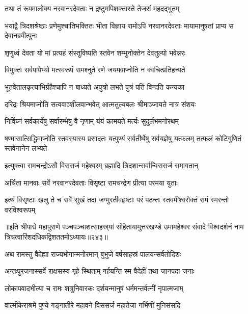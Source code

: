 \twolineshloka
{तथा तं रूपमालोक्य नरवानरदेवताः}
{न द्रष्टुमपिशक्तास्ते तेजसं महदद्भुतम्}%


\threelineshloka
{भयाद्वै त्रिदशश्रेष्ठाः प्रणेमुश्चातिभक्तितः}
{भीता विज्ञाय रामोऽपि नरवानरदेवताः}
{मायामानुषतां प्राप्य स देवानब्रवीत्पुनः}%


\twolineshloka
{शृणुध्वं देवता यो मां प्रत्यहं संस्तुविष्यति}
{स्तवेन शम्भुनोक्तेन देवतुल्यो भवेन्नरः}%

\twolineshloka
{विमुक्तः सर्वपापेभ्यो मत्स्वरूपं समश्नुते}
{रणे जयमवाप्नोति न क्वचित्प्रतिहन्यते}%

\twolineshloka
{भूतवेतालकृत्याभिर्ग्रहैश्चापि न बाध्यते}
{अपुत्रो लभते पुत्रं पतिं विन्दति कन्यका}%

\twolineshloka
{दरिद्रः श्रियमाप्नोति सत्ववाञ्शीलवान्भवेत्}
{आत्मतुल्यबलः श्रीमाञ्जायते नात्र संशयः}%

\twolineshloka
{निर्विघ्नं सर्वकार्येषु सर्वारम्भेषु वै नृणाम्}
{यंयं कामयते मर्त्यः सुदुर्लभमनोरथम्}%


\threelineshloka
{षण्मासात्सिद्धिमाप्नोति स्तवस्यास्य प्रसादतः}
{यत्पुण्यं सर्वतीर्थेषु सर्वयज्ञेषु यत्फलम्}
{तत्फलं कोटिगुणितं स्तवेनानेन लभ्यते}%


\twolineshloka
{इत्युक्त्वा रामचन्द्रोऽसौ विससर्ज महेश्वरम्}
{ब्रह्मादि त्रिदशान्सर्वान्विससर्ज समागतान्}%

\twolineshloka
{अर्चिता मानवाः सर्वे नरवानरदेवताः}
{विसृष्टा रामचन्द्रेण प्रीत्या परमया युताः}%

\twolineshloka
{इत्थं विसृष्टाः खलु ते च सर्वे सुखं तदा जग्मुरतीवहृष्टाः}
{परं पठन्तः स्तवमीश्वरोक्तं रामं स्मरन्तो वरविश्वरूपम्}%

{॥इति श्रीपाद्मे महापुराणे पञ्चपञ्चाशत्साहस्र्यां संहितायामुत्तरखण्डे उमामहेश्वर संवादे विश्वदर्शनं नाम त्रिचत्वारिंशदधिकद्विशततमोऽध्यायः॥२४३॥}



\twolineshloka
{अथ रामस्तु वैदेह्या राज्यभोगान्मनोरमान्}
{बुभुजे वर्षसाहस्रं पालयन्सर्वतोदिशः}%

\twolineshloka
{अन्तःपुरजनास्सर्वे राक्षसस्य गृहे स्थिताम्}
{गर्हयन्ति स्म वैदेहीं तथा जानपदा जनाः}%

\twolineshloka
{लोकापवादभीत्या च रामः शत्रुनिवारकः}
{दर्शयन्मानुषं धर्ममन्तर्वत्नीं नृपात्मजाम्}%

\twolineshloka
{वाल्मीकेराश्रमे पुण्ये गङ्गातीरे महावने}
{विससर्ज महातेजा गर्भिणीं मुनिसंसदि}%

